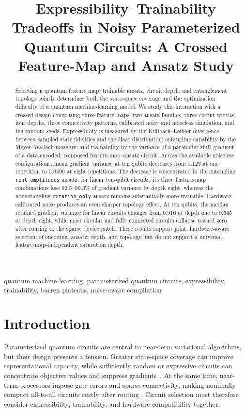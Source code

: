 \documentclass[conference]{IEEEtran}
\title{Expressibility--Trainability Tradeoffs in Noisy Parameterized
Quantum Circuits: A Crossed Feature-Map and Ansatz Study}
\author{\IEEEauthorblockN{Author Name(s)}
\IEEEauthorblockA{Department or Laboratory\\
Institution\\
City, Country\\
email@example.com}}
\begin{document}
\maketitle

\begin{abstract}
Selecting a quantum feature map, trainable ansatz, circuit depth, and
entanglement topology jointly determines both the state-space coverage and
the optimization difficulty of a quantum machine-learning model.  We study
this interaction with a crossed design comprising three feature maps, two
ansatz families, three circuit widths, four depths, three connectivity
patterns, calibrated noisy and noiseless simulation, and ten random seeds.
Expressibility is measured by the Kullback--Leibler divergence between
sampled state fidelities and the Haar distribution; entangling capability by
the Meyer--Wallach measure; and trainability by the variance of a
parameter-shift gradient of a data-encoded, composed feature-map--ansatz
circuit.  Across the available noiseless configurations, mean gradient
variance at ten qubits decreases from 0.123 at one repetition to 0.0496 at
eight repetitions.  The decrease is concentrated in the entangling
\texttt{real\_amplitudes} ansatz: for linear ten-qubit circuits, its three
feature-map combinations lose 92.5--99.3\% of gradient variance by depth
eight, whereas the nonentangling \texttt{rotation\_only} ansatz remains
substantially more trainable.  Hardware-calibrated noise produces an even
sharper topology effect.  At ten qubits, the median retained gradient
variance for linear circuits changes from 0.916 at depth one to 0.545 at
depth eight, while most circular and fully connected circuits collapse
toward zero after routing to the sparse device patch.  These results support
joint, hardware-aware selection of encoding, ansatz, depth, and topology,
but do not support a universal feature-map-independent saturation depth.
\end{abstract}

\begin{IEEEkeywords}
quantum machine learning, parameterized quantum circuits, expressibility,
trainability, barren plateaus, noise-aware compilation
\end{IEEEkeywords}

\section{Introduction}

Parameterized quantum circuits are central to near-term variational
algorithms, but their design presents a tension.  Greater state-space
coverage can improve representational capacity, while sufficiently random
or expressive circuits can concentrate objective values and suppress
gradients~\cite{mcclean2018barren,holmes2022connecting}.  At the same time,
near-term processors impose gate errors and sparse connectivity, making
nominally compact all-to-all circuits costly after routing
\cite{preskill2018nisq}.  Circuit selection must therefore consider
expressibility, trainability, and hardware compatibility together.
\end{document}

